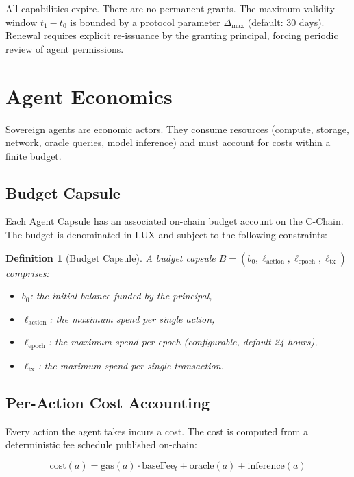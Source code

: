 \documentclass[11pt,a4paper]{article}
\newtheorem{definition}{Definition}
\begin{document}
All capabilities expire. There are no permanent grants. The maximum validity window $t_1 - t_0$ is bounded by a protocol parameter $\Delta_{\max}$ (default: 30 days). Renewal requires explicit re-issuance by the granting principal, forcing periodic review of agent permissions.

\section{Agent Economics}\label{sec:economics}

Sovereign agents are economic actors. They consume resources (compute, storage, network, oracle queries, model inference) and must account for costs within a finite budget.

\subsection{Budget Capsule}

Each Agent Capsule has an associated on-chain budget account on the C-Chain. The budget is denominated in LUX and subject to the following constraints:

\begin{definition}[Budget Capsule]
A budget capsule $B = (b_0, \ell_{\text{action}}, \ell_{\text{epoch}}, \ell_{\text{tx}})$ comprises:
\begin{itemize}
    \item $b_0$: the initial balance funded by the principal,
    \item $\ell_{\text{action}}$: the maximum spend per single action,
    \item $\ell_{\text{epoch}}$: the maximum spend per epoch (configurable, default 24 hours),
    \item $\ell_{\text{tx}}$: the maximum spend per single transaction.
\end{itemize}
\end{definition}

\subsection{Per-Action Cost Accounting}

Every action the agent takes incurs a cost. The cost is computed from a deterministic fee schedule published on-chain:

\begin{equation}\label{eq:cost}
    \text{cost}(a) = \text{gas}(a) \cdot \text{baseFee}_t + \text{oracle}(a) + \text{inference}(a)
\end{equation}
\end{document}
